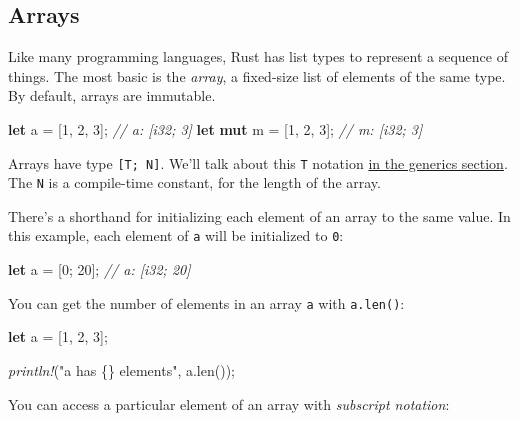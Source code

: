 \documentclass[a4paper,]{book}
\newenvironment{Shaded}{\begin{snugshade}}{\end{snugshade}}
\newcommand{\KeywordTok}[1]{\textcolor[rgb]{0.13,0.29,0.53}{\textbf{{#1}}}}
\newcommand{\DecValTok}[1]{\textcolor[rgb]{0.00,0.00,0.81}{{#1}}}
\newcommand{\StringTok}[1]{\textcolor[rgb]{0.31,0.60,0.02}{{#1}}}
\newcommand{\CommentTok}[1]{\textcolor[rgb]{0.56,0.35,0.01}{\textit{{#1}}}}
\newcommand{\PreprocessorTok}[1]{\textcolor[rgb]{0.56,0.35,0.01}{\textit{{#1}}}}
\newcommand{\NormalTok}[1]{{#1}}
\begin{document}
\hypertarget{arrays}{\subsection{Arrays}\label{arrays}}

Like many programming languages, Rust has list types to represent a
sequence of things. The most basic is the \emph{array}, a fixed-size
list of elements of the same type. By default, arrays are immutable.

\begin{Shaded}
\begin{Highlighting}[]
\KeywordTok{let} \NormalTok{a = [}\DecValTok{1}\NormalTok{, }\DecValTok{2}\NormalTok{, }\DecValTok{3}\NormalTok{]; }\CommentTok{// a: [i32; 3]}
\KeywordTok{let} \KeywordTok{mut} \NormalTok{m = [}\DecValTok{1}\NormalTok{, }\DecValTok{2}\NormalTok{, }\DecValTok{3}\NormalTok{]; }\CommentTok{// m: [i32; 3]}
\end{Highlighting}
\end{Shaded}

Arrays have type \texttt{{[}T;\ N{]}}. We'll talk about this \texttt{T}
notation \protect\hyperlink{sec--generics}{in the generics section}. The
\texttt{N} is a compile-time constant, for the length of the array.

There's a shorthand for initializing each element of an array to the
same value. In this example, each element of \texttt{a} will be
initialized to \texttt{0}:

\begin{Shaded}
\begin{Highlighting}[]
\KeywordTok{let} \NormalTok{a = [}\DecValTok{0}\NormalTok{; }\DecValTok{20}\NormalTok{]; }\CommentTok{// a: [i32; 20]}
\end{Highlighting}
\end{Shaded}

You can get the number of elements in an array \texttt{a} with
\texttt{a.len()}:

\begin{Shaded}
\begin{Highlighting}[]
\KeywordTok{let} \NormalTok{a = [}\DecValTok{1}\NormalTok{, }\DecValTok{2}\NormalTok{, }\DecValTok{3}\NormalTok{];}

\PreprocessorTok{println!}\NormalTok{(}\StringTok{"a has \{\} elements"}\NormalTok{, a.len());}
\end{Highlighting}
\end{Shaded}

You can access a particular element of an array with \emph{subscript
notation}:
\end{document}
